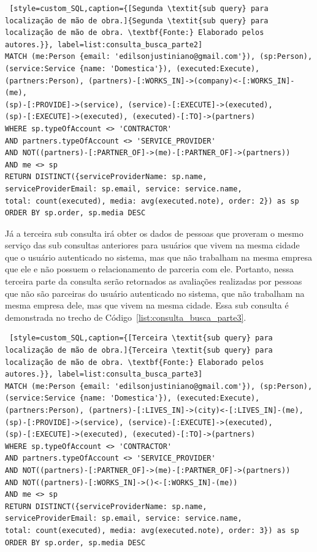\begin{lstlisting} [style=custom_SQL,caption={[Segunda \textit{sub query} para localização de mão de obra.]{Segunda \textit{sub query} para localização de mão de obra. \textbf{Fonte:} Elaborado pelos autores.}}, label=list:consulta_busca_parte2] 	
MATCH (me:Person {email: 'edilsonjustiniano@gmail.com'}), (sp:Person),
(service:Service {name: 'Domestica'}), (executed:Execute),
(partners:Person), (partners)-[:WORKS_IN]->(company)<-[:WORKS_IN]-(me),
(sp)-[:PROVIDE]->(service), (service)-[:EXECUTE]->(executed), 
(sp)-[:EXECUTE]->(executed), (executed)-[:TO]->(partners)
WHERE sp.typeOfAccount <> 'CONTRACTOR' 
AND partners.typeOfAccount <> 'SERVICE_PROVIDER'
AND NOT((partners)-[:PARTNER_OF]->(me)-[:PARTNER_OF]->(partners))
AND me <> sp
RETURN DISTINCT({serviceProviderName: sp.name, 
serviceProviderEmail: sp.email, service: service.name, 
total: count(executed), media: avg(executed.note), order: 2}) as sp 
ORDER BY sp.order, sp.media DESC
\end{lstlisting}


Já a terceira sub consulta irá obter os dados de pessoas que proveram o mesmo serviço das sub consultas anteriores para usuários que vivem na mesma cidade que o usuário autenticado no sistema, mas que não trabalham na mesma empresa que ele e não possuem o relacionamento de parceria com ele. Portanto, nessa terceira parte da consulta serão retornados as avaliações realizadas por pessoas que não são parceiras do usuário autenticado no sistema, que não trabalham na mesma empresa dele, mas que vivem na mesma cidade. Essa sub consulta é demonstrada no trecho de Código~\ref{list:consulta_busca_parte3}.

\begin{lstlisting} [style=custom_SQL,caption={[Terceira \textit{sub query} para localização de mão de obra.]{Terceira \textit{sub query} para localização de mão de obra. \textbf{Fonte:} Elaborado pelos autores.}}, label=list:consulta_busca_parte3] 	
MATCH (me:Person {email: 'edilsonjustiniano@gmail.com'}), (sp:Person),
(service:Service {name: 'Domestica'}), (executed:Execute), 
(partners:Person), (partners)-[:LIVES_IN]->(city)<-[:LIVES_IN]-(me),
(sp)-[:PROVIDE]->(service), (service)-[:EXECUTE]->(executed), 
(sp)-[:EXECUTE]->(executed), (executed)-[:TO]->(partners)
WHERE sp.typeOfAccount <> 'CONTRACTOR' 
AND partners.typeOfAccount <> 'SERVICE_PROVIDER'
AND NOT((partners)-[:PARTNER_OF]->(me)-[:PARTNER_OF]->(partners))
AND NOT((partners)-[:WORKS_IN]->()<-[:WORKS_IN]-(me))
AND me <> sp
RETURN DISTINCT({serviceProviderName: sp.name, 
serviceProviderEmail: sp.email, service: service.name, 
total: count(executed), media: avg(executed.note), order: 3}) as sp 
ORDER BY sp.order, sp.media DESC 
\end{lstlisting}

